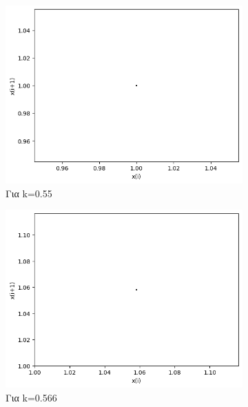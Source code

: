 \begin{figure}[h!]
	\centering
	
	\begin{subfigure}[b]{0.4\textwidth}
		\centering
		\includegraphics[width=\textwidth]{LateX images/graphs q12/g3}
		\caption{Για k=0.55}
		\label{f:k59}
	\end{subfigure}
	\hfill
	\begin{subfigure}[b]{0.4\textwidth}
		\centering
		\includegraphics[width=\textwidth]{LateX images/graphs q12/g4}
		\caption{Για k=0.566}
		\label{f:k60}
	\end{subfigure}
	\hfill
	\begin{subfigure}[b]{0.4\textwidth}
		\centering

\end{subfigure}
\end{figure}
